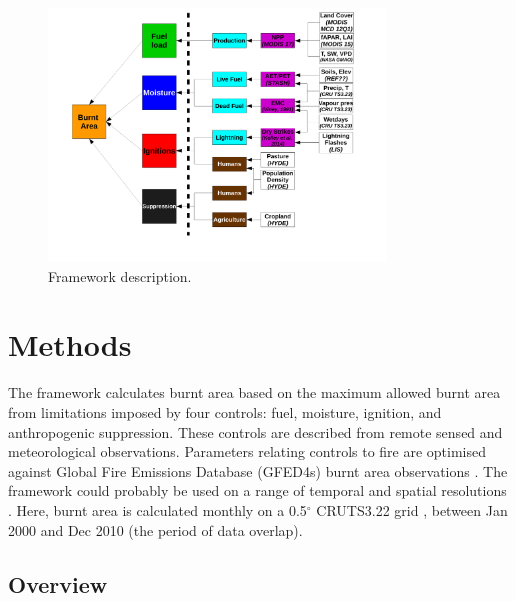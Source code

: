 \begin{figure}[!ht]
  \centering
    \includegraphics[width=0.8\textwidth]{Model_schematic.pdf}
  \caption{Framework description.}
\end{figure}


\section{Methods}
The framework calculates burnt area based on the maximum allowed burnt area from limitations imposed by four controls: fuel, moisture, ignition, and anthropogenic suppression. These controls are described from remote sensed and meteorological observations. Parameters relating controls to fire are optimised against Global Fire Emissions Database (GFED4s) burnt area observations \citep{Giglio2013}.
The framework could probably be used on a range of temporal and spatial resolutions
.
Here, burnt area is calculated monthly on a 0.5$^{\circ}$ CRUTS3.22 grid \citep{harris2014cru}, between Jan 2000 and Dec 2010 (the period of data overlap).


\subsection{Overview}

